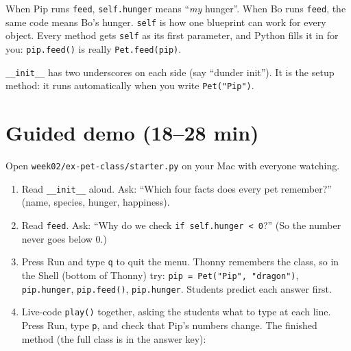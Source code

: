 \begin{analogy}
When Pip runs \texttt{feed}, \texttt{self.hunger} means \enquote{\emph{my} hunger}. When Bo runs \texttt{feed}, the same code means Bo's hunger. \texttt{self} is how one blueprint can work for every object. Every method gets \texttt{self} as its first parameter, and Python fills it in for you: \texttt{pip.feed()} is really \texttt{Pet.feed(pip)}.
\end{analogy}
\texttt{\_\_init\_\_} has two underscores on each side (say \enquote{dunder init}). It is the setup method: it runs automatically when you write \texttt{Pet("Pip")}.

\section{Guided demo (18--28 min)}
Open \texttt{week02/ex-pet-class/starter.py} on your Mac with everyone watching.
\begin{workedexample}
\begin{enumerate}[itemsep=2pt]
  \item Read \texttt{\_\_init\_\_} aloud. Ask: \enquote{Which four facts does every pet remember?} (name, species, hunger, happiness).
  \item Read \texttt{feed}. Ask: \enquote{Why do we check \texttt{if self.hunger < 0}?} (So the number never goes below 0.)
  \item Press Run and type \texttt{q} to quit the menu. Thonny remembers the class, so in the Shell (bottom of Thonny) try: \texttt{pip = Pet("Pip", "dragon")}, \texttt{pip.hunger}, \texttt{pip.feed()}, \texttt{pip.hunger}. Students predict each answer first.
  \item Live-code \texttt{play()} together, asking the students what to type at each line. Press Run, type \texttt{p}, and check that Pip's numbers change. The finished method (the full class is in the answer key):
\end{enumerate}
\end{workedexample}

